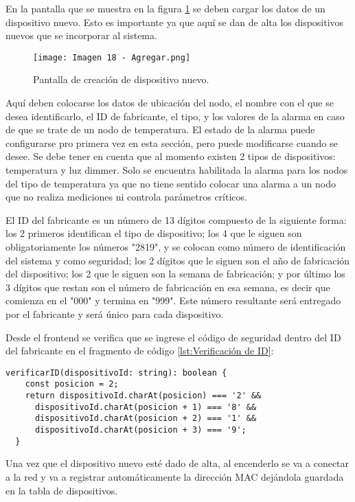En la pantalla que se muestra en la figura \ref{fig:18} se deben cargar los datos de un dispositivo nuevo. Esto es importante ya que aquí se dan de alta los dispositivos nuevos que se incorporar al sistema.

\begin{figure}[h]
\centering
\texttt{[image: Imagen 18 - Agregar.png]}
\caption[Pantalla home]{Pantalla de creación de dispositivo nuevo. \footnotemark}
\label{fig:18}
\end{figure}

Aquí deben colocarse los datos de ubicación del nodo, el nombre con el que se desea identificarlo, el ID de fabricante, el tipo, y los valores de la alarma en caso de que se trate de un nodo de temperatura. El estado de la alarma puede configurarse pro primera vez en esta sección, pero puede modificarse cuando se desee. Se debe tener en cuenta que al momento existen 2 tipos de dispositivos: temperatura y luz dimmer. Solo se encuentra habilitada la alarma para los nodos del tipo de temperatura ya que no tiene sentido colocar una alarma a un nodo que no realiza mediciones ni controla parámetros críticos.

El ID del fabricante es un número de 13 dígitos compuesto de la siguiente forma: los 2 primeros identifican el tipo de dispositivo; los 4 que le siguen son obligatoriamente los números "2819", y se colocan como número de identificación del sistema y como seguridad; los 2 dígitos que le siguen son el año de fabricación del dispositivo; los 2 que le siguen son la semana de fabricación; y por último los 3 dígitos que restan son el número de fabricación en esa semana, es decir que comienza en el "000" y termina en "999". Este número resultante será entregado por el fabricante y será único para cada dispositivo.

Desde el frontend se verifica que se ingrese el código de seguridad dentro del ID del fabricante en el fragmento de código \ref{lst:Verificación de ID}:

\begin{lstlisting}[caption={Verificación de ID}, label={lst:Verificación de ID}]
verificarID(dispositivoId: string): boolean {
    const posicion = 2;
    return dispositivoId.charAt(posicion) === '2' &&
      dispositivoId.charAt(posicion + 1) === '8' &&
      dispositivoId.charAt(posicion + 2) === '1' &&
      dispositivoId.charAt(posicion + 3) === '9';
  }
\end{lstlisting}

Una vez que el dispositivo nuevo esté dado de alta, al encenderlo se va a conectar a la red y va a registrar automáticamente la dirección MAC dejándola guardada en la tabla de dispositivos.

